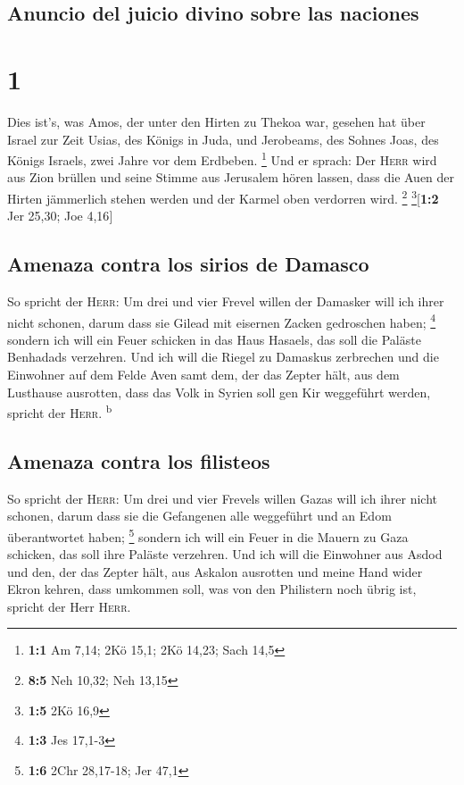 \hypertarget{anuncio-del-juicio-divino-sobre-las-naciones}{%
\subsection{Anuncio del juicio divino sobre las
naciones}\label{anuncio-del-juicio-divino-sobre-las-naciones}}

\hypertarget{section}{%
\section{1}\label{section}}

 Dies ist's, was Amos, der unter den Hirten zu Thekoa war,
gesehen hat über Israel zur Zeit Usias, des Königs in Juda, und
Jerobeams, des Sohnes Joas, des Königs Israels, zwei Jahre vor dem
Erdbeben. \footnote{\textbf{1:1} Am 7,14; 2Kö 15,1; 2Kö 14,23; Sach 14,5}
 Und er sprach: Der \textsc{Herr} wird aus Zion brüllen
und seine Stimme aus Jerusalem hören lassen, dass die Auen der Hirten
jämmerlich stehen werden und der Karmel oben verdorren wird. \footnote{\textbf{8:5}
  Neh 10,32; Neh 13,15} \footnote{\textbf{1:5} 2Kö 16,9}{[}\textbf{1:2}
Jer 25,30; Joe 4,16{]}

\hypertarget{amenaza-contra-los-sirios-de-damasco}{%
\subsection{Amenaza contra los sirios de
Damasco}\label{amenaza-contra-los-sirios-de-damasco}}

 So spricht der \textsc{Herr}: Um drei und vier Frevel
willen der Damasker will ich ihrer nicht schonen, darum dass sie Gilead
mit eisernen Zacken gedroschen haben; \footnote{\textbf{1:3} Jes 17,1-3}
 sondern ich will ein Feuer schicken in das Haus Hasaels,
das soll die Paläste Benhadads verzehren.  Und ich will
die Riegel zu Damaskus zerbrechen und die Einwohner auf dem Felde Aven
samt dem, der das Zepter hält, aus dem Lusthause ausrotten, dass das
Volk in Syrien soll gen Kir weggeführt werden, spricht der
\textsc{Herr}. \textsuperscript{b}

\hypertarget{amenaza-contra-los-filisteos}{%
\subsection{Amenaza contra los
filisteos}\label{amenaza-contra-los-filisteos}}

 So spricht der \textsc{Herr}: Um drei und vier Frevels
willen Gazas will ich ihrer nicht schonen, darum dass sie die Gefangenen
alle weggeführt und an Edom überantwortet haben; \footnote{\textbf{1:6}
  2Chr 28,17-18; Jer 47,1}  sondern ich will ein Feuer in
die Mauern zu Gaza schicken, das soll ihre Paläste verzehren.
 Und ich will die Einwohner aus Asdod und den, der das
Zepter hält, aus Askalon ausrotten und meine Hand wider Ekron kehren,
dass umkommen soll, was von den Philistern noch übrig ist, spricht der
Herr \textsc{Herr}.

